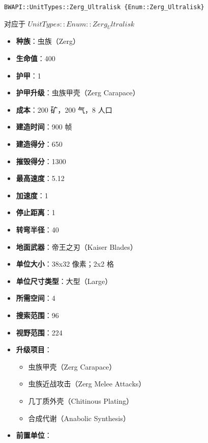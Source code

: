 \begin{tcolorbox}[colback=white, colframe=black!60!white, title=Zerg\_Ultralisk(), arc=0mm]
    \begin{verbatim}
BWAPI::UnitTypes::Zerg_Ultralisk {Enum::Zerg_Ultralisk}
    \end{verbatim}
    对应于  $ UnitTypes::Enum::Zerg_Ultralisk $ 
    \begin{itemize}
        \item \textbf{种族}：虫族（Zerg）
        \item \textbf{生命值}：400
        \item \textbf{护甲}：1
        \item \textbf{护甲升级}：虫族甲壳（Zerg Carapace）
        \item \textbf{成本}：200 矿，200 气，8 人口
        \item \textbf{建造时间}：900 帧
        \item \textbf{建造得分}：650
        \item \textbf{摧毁得分}：1300
        \item \textbf{最高速度}：5.12
        \item \textbf{加速度}：1
        \item \textbf{停止距离}：1
        \item \textbf{转弯半径}：40
        \item \textbf{地面武器}：帝王之刃（Kaiser Blades）
        \item \textbf{单位大小}：38x32 像素；2x2 格
        \item \textbf{单位尺寸类型}：大型（Large）
        \item \textbf{所需空间}：4
        \item \textbf{搜索范围}：96
        \item \textbf{视野范围}：224
        \item \textbf{升级项目}：
            \begin{itemize}
                \item 虫族甲壳（Zerg Carapace）
                \item 虫族近战攻击（Zerg Melee Attacks）
                \item 几丁质外壳（Chitinous Plating）
                \item 合成代谢（Anabolic Synthesis）
            \end{itemize}
        \item \textbf{前置单位}：
            \begin{itemize}

\end{itemize}
\end{itemize}
\end{tcolorbox}
